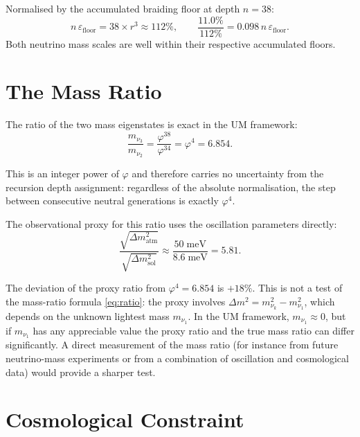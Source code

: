 \documentclass[12pt]{article}
\begin{document}
Normalised by the accumulated braiding floor at depth $n = 38$:
\[
  n\,\varepsilon_{\text{floor}} = 38 \times r^3 \approx 112\%,
  \qquad
  \frac{11.0\%}{112\%} = 0.098\,n\,\varepsilon_{\text{floor}}.
\]
Both neutrino mass scales are well within their respective
accumulated floors.

\section{The Mass Ratio}

The ratio of the two mass eigenstates is exact in the UM framework:
\begin{equation}
  \frac{m_{\nu_3}}{m_{\nu_2}}
    = \frac{\varphi^{38}}{\varphi^{34}}
    = \varphi^4
    = 6.854.
  \label{eq:ratio}
\end{equation}

This is an integer power of $\varphi$ and therefore carries no
uncertainty from the recursion depth assignment: regardless of
the absolute normalisation, the step between consecutive neutral
generations is exactly $\varphi^4$.

The observational proxy for this ratio uses the oscillation
parameters directly:
\begin{equation}
  \frac{\sqrt{\Delta m^2_{\text{atm}}}}{\sqrt{\Delta m^2_{\text{sol}}}}
    \approx \frac{50\;\text{meV}}{8.6\;\text{meV}} = 5.81.
\end{equation}

The deviation of the proxy ratio from $\varphi^4 = 6.854$ is $+18\%$.
This is not a test of the mass-ratio formula \eqref{eq:ratio}:
the proxy involves $\Delta m^2 = m_{\nu_k}^2 - m_{\nu_1}^2$, which
depends on the unknown lightest mass $m_{\nu_1}$.  In the UM framework,
$m_{\nu_1} \approx 0$, but if $m_{\nu_1}$ has any appreciable value
the proxy ratio and the true mass ratio can differ significantly.  A
direct measurement of the mass ratio (for instance from future
neutrino-mass experiments or from a combination of oscillation and
cosmological data) would provide a sharper test.

\section{Cosmological Constraint}
\end{document}
